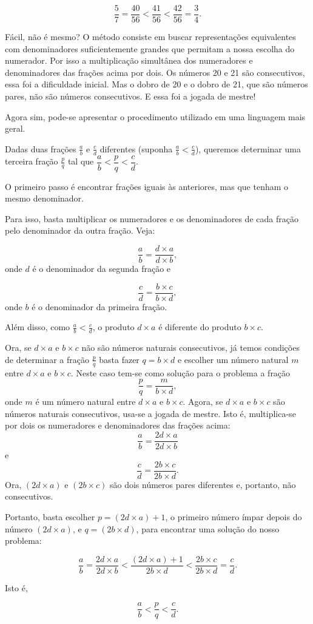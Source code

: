\begin{refletindo*}{}
  $$\dfrac{5}{7} = \dfrac{40}{56} < \dfrac{41}{56} < \dfrac{42}{56} =\dfrac{3}{4}.$$

  Fácil, não é mesmo? O método consiste em buscar representações equivalentes com denominadores suficientemente grandes que permitam a nossa escolha do numerador. Por isso a multiplicação simultânea dos numeradores e denominadores das frações acima por dois. Os números 20 e 21 são consecutivos, essa foi a dificuldade inicial. Mas o dobro de 20 e o dobro de 21, que são números pares, não são números consecutivos. E essa foi a jogada de mestre!

  Agora sim, pode-se apresentar o procedimento utilizado em uma linguagem mais geral.

  Dadas duas frações   $\frac{a}{b}$ e   $\frac{c}{d}$ diferentes (suponha   $\frac{a}{b}<\frac{c}{d}$), queremos determinar uma terceira fração   $\frac{p}{q}$ tal que   $\dfrac{a}{b}<\dfrac{p}{q}<\dfrac{c}{d}$.

  O primeiro passo é encontrar frações iguais às anteriores, mas que tenham o mesmo denominador.

  Para isso, basta multiplicar os numeradores e os denominadores de cada fração pelo denominador da outra fração. Veja:

  $$\dfrac{a}{b} = \dfrac{d \times a}{d \times b},$$
  onde   $d$ é o denominador da segunda fração e

  $$\dfrac{c}{d} = \dfrac{b \times c}{b \times d},$$
  onde   $b$ é o denominador da primeira fração.

  Além disso, como   $\frac{a}{b}<\frac{c}{d}$, o produto   $d \times a$ é diferente do produto   $b \times c$.

  Ora, se   $d \times a$ e   $b \times c$ não são números naturais consecutivos, já temos condições de determinar a fração   $\frac{p}{q}$ basta fazer   $q = b \times d$ e escolher um número natural   $m$ entre   $d \times a$ e   $b \times c$. Neste caso tem-se como solução para o problema a fração
  $$\dfrac{p}{q} = \dfrac{m}{b \times d},$$
  onde   $m$ é um número natural entre   $d \times a$ e   $b \times c$.
  Agora, se   $d \times a$ e   $b \times c$ são números naturais consecutivos, usa-se a jogada de mestre. Isto é, multiplica-se por dois os numeradores e denominadores das frações acima:
  $$\dfrac{a}{b} = \dfrac{2d \times a}{2d \times b}$$
  e
  $$\dfrac{c}{d} = \dfrac{2b \times c}{2b \times d}.$$
  Ora,   $(2d \times a)$ e $(2b \times c)$ são dois números pares diferentes e, portanto, não consecutivos.

  Portanto, basta escolher   $p = (2d \times a) + 1$, o primeiro número ímpar depois do número    $(2d \times a)$,  e   $q=(2b \times d)$, para encontrar uma solução do nosso problema:

  $$\dfrac{a}{b} = \dfrac{2d \times a}{2d \times b} < \dfrac{(2d \times a) + 1}{2b \times d} <  \dfrac{2b \times c}{2b \times d} = \dfrac{c}{d}.$$

  Isto é,

  $$\dfrac{a}{b} < \dfrac{p}{q} < \dfrac{c}{d}.$$

\end{refletindo*}

